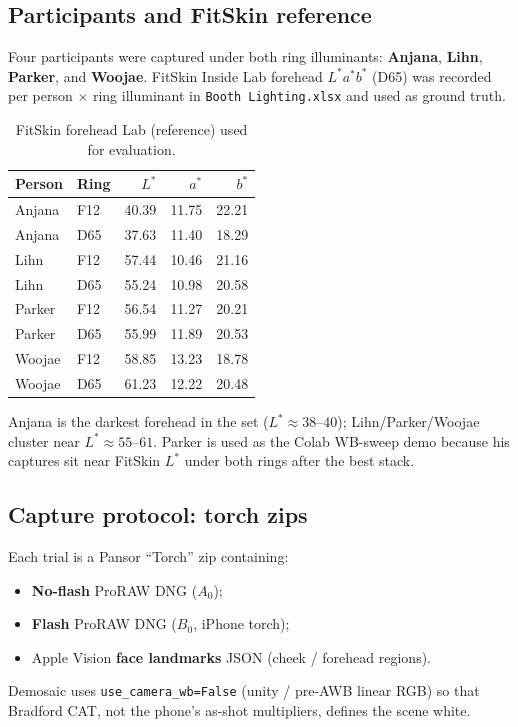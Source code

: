\documentclass[11pt]{article}
\begin{document}
\subsection{Participants and FitSkin reference}
Four participants were captured under both ring illuminants:
\textbf{Anjana}, \textbf{Lihn}, \textbf{Parker}, and \textbf{Woojae}.
FitSkin Inside Lab forehead $L^*a^*b^*$ (D65) was recorded per person $\times$
ring illuminant in \texttt{Booth Lighting.xlsx} and used as ground truth.

\begin{table}[h]
\centering
\caption{FitSkin forehead Lab (reference) used for evaluation.}
\label{tab:fitskin}
\begin{tabular}{llrrr}
\toprule
Person & Ring & $L^*$ & $a^*$ & $b^*$ \\
\midrule
Anjana & F12 & 40.39 & 11.75 & 22.21 \\
Anjana & D65 & 37.63 & 11.40 & 18.29 \\
Lihn   & F12 & 57.44 & 10.46 & 21.16 \\
Lihn   & D65 & 55.24 & 10.98 & 20.58 \\
Parker & F12 & 56.54 & 11.27 & 20.21 \\
Parker & D65 & 55.99 & 11.89 & 20.53 \\
Woojae & F12 & 58.85 & 13.23 & 18.78 \\
Woojae & D65 & 61.23 & 12.22 & 20.48 \\
\bottomrule
\end{tabular}
\end{table}

Anjana is the darkest forehead in the set ($L^*\approx 38$--$40$); Lihn/Parker/Woojae
cluster near $L^*\approx 55$--$61$. Parker is used as the Colab WB-sweep demo
because his captures sit near FitSkin $L^*$ under both rings after the best stack.

\subsection{Capture protocol: torch zips}
Each trial is a Pansor ``Torch'' zip containing:
\begin{itemize}[leftmargin=*]
  \item \textbf{No-flash} ProRAW DNG ($A_0$);
  \item \textbf{Flash} ProRAW DNG ($B_0$, iPhone torch);
  \item Apple Vision \textbf{face landmarks} JSON (cheek / forehead regions).
\end{itemize}
Demosaic uses \texttt{use\_camera\_wb=False} (unity / pre-AWB linear RGB) so
that Bradford CAT, not the phone's as-shot multipliers, defines the scene white.
\end{document}
